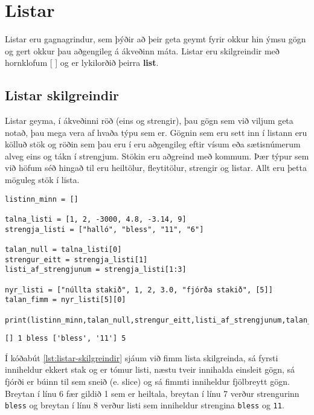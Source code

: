 
\chapter{Listar}\label{k:listar}
Listar eru gagnagrindur, sem þýðir að þeir geta geymt fyrir okkur hin ýmsu gögn og gert okkur þau aðgengileg á ákveðinn máta.
Listar eru skilgreindir með hornklofum [ ] og er lykilorðið þeirra \textbf{list}.

\section{Listar skilgreindir}\label{uk:listar-skilgreindir}
Listar geyma, í ákveðinni röð (eins og strengir), þau gögn sem við viljum geta notað, þau mega vera af hvaða týpu sem er.
Gögnin sem eru sett inn í listann eru kölluð stök og röðin sem þau eru í eru aðgengileg eftir vísum eða sætisnúmerum alveg eins og tákn í strengjum.
Stökin eru aðgreind með kommum.
Þær týpur sem við höfum séð hingað til eru heiltölur, fleytitölur, strengir og listar.
Allt eru þetta möguleg stök í lista.

\begin{lstlisting}[caption=Listar skilgreindir, label=lst:listar-skilgreindir]
listinn_minn = []

talna_listi = [1, 2, -3000, 4.8, -3.14, 9]
strengja_listi = ["halló", "bless", "11", "6"]

talan_null = talna_listi[0]
strengur_eitt = strengja_listi[1]
listi_af_strengjunum = strengja_listi[1:3]

nyr_listi = ["núllta stakið", 1, 2, 3.0, "fjórða stakið", [5]]
talan_fimm = nyr_listi[5][0]

print(listinn_minn,talan_null,strengur_eitt,listi_af_strengjunum,talan_fimm)
\end{lstlisting}
\lstset{style=uttak}
\begin{lstlisting}
[] 1 bless ['bless', '11'] 5
\end{lstlisting}
\lstset{style=venjulegt}

Í kóðabút \ref{lst:listar-skilgreindir} sjáum við fimm lista skilgreinda, sá fyrsti inniheldur ekkert stak og er tómur listi, næstu tveir innihalda einsleit gögn, sá fjórði er búinn til sem sneið (e. slice) og sá fimmti inniheldur fjölbreytt gögn.
Breytan í línu 6 fær gildið 1 sem er heiltala, breytan í línu 7 verður strengurinn \texttt{bless} og breytan í línu 8 verður listi sem inniheldur strengina \texttt{bless} og \texttt{11}.

